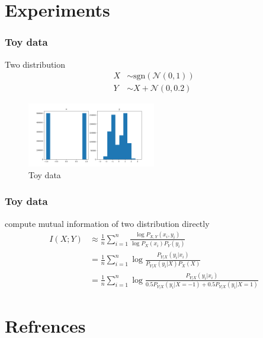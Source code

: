 \documentclass[aspectratio=169]{beamer}
\begin{document}
\section{Experiments}
\begin{frame}
	\frametitle{Toy data}
	Two distribution
	\begin{align*}
		X &\sim \text{sgn}(\mathcal{N}(0,1)) \\
		Y &\sim X+\mathcal{N}(0, 0.2)
	\end{align*}
	\begin{figure}
		\centering
		\includegraphics[width=0.5\textwidth]{./images/toy_data.png}
		\caption{Toy data}
		\label{fig:toy_data}
	\end{figure}
\end{frame}

\begin{frame}
	\frametitle{Toy data}
	compute mutual information of two distribution directly
	\begin{align*}
		I(X;Y)	&\approx \frac{1}{n} \sum_{i=1}^n \frac{\log{P_{X,Y}(x_i, y_i)}}{\log{P_X(x_i)}{P_Y(y_i)}} \\
		& = \frac{1}{n} \sum_{i=1}^n \log{\frac{{P_{Y|X}(y_i|x_i)}}{{P_{Y|X}(y_i|X)}{P_X(X)}}} \\
		& = \frac{1}{n} \sum_{i=1}^n \log{\frac{{P_{Y|X}(y_i|x_i)}}{{0.5 P_{Y|X}(y_i|X = -1)} + {0.5 P_{Y|X}(y_i|X = 1)}}}
	\end{align*}
\end{frame}

\begin{frame}
	\toydata
\end{frame}



\section{Refrences}
\begin{frame}
\end{frame}
\end{document}
